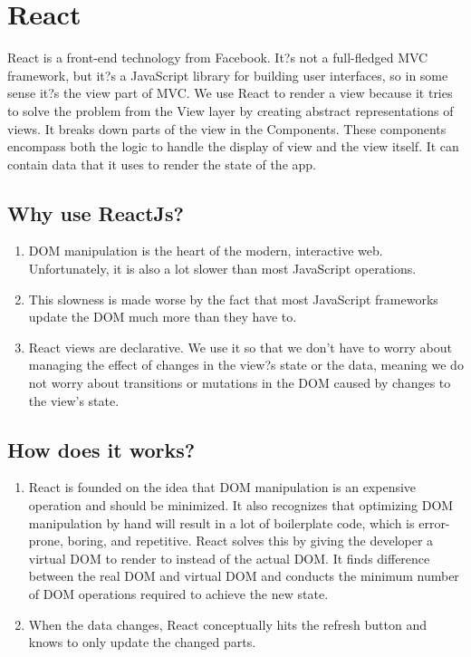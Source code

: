 \documentclass[12pt,a4paper]{report}
\begin{document}
\section{React}
React \cite{wiki:reactjs} is a front-end technology from Facebook. It?s not a full-fledged MVC framework, but it?s a JavaScript library for building user interfaces, so in some sense it?s the view part of MVC. We use React to render a view because it tries to solve the problem from the View layer by creating abstract representations of views. It breaks down parts of the view in the Components. These components encompass both the logic to handle the display of view and the view itself. It can contain data that it uses to render the state of the app. 
\subsection{Why use ReactJs?}\cite{parking_marketplace_srs}
\begin{enumerate}
	\renewcommand{\labelenumi}{{\textbf{\arabic{enumi}.}}}
	\item DOM manipulation is the heart of the modern, interactive web. Unfortunately, it is also a lot slower than most JavaScript operations.
	\item This slowness is made worse by the fact that most JavaScript frameworks update the DOM much more than they have to.
	\item React views are declarative. We use it so that we don't have to worry about managing the effect of changes in the view?s state or the data, meaning we do not worry about transitions or mutations in the DOM caused by changes to the view's state.  
\end{enumerate}
\subsection{How does it works?}\cite{parking_marketplace_srs}
\begin{enumerate}
	\renewcommand{\labelenumi}{{\textbf{\arabic{enumi}.}}}
	\item React is founded on the idea that DOM manipulation is an expensive operation and should be minimized. It also recognizes that optimizing DOM manipulation by hand will result in a lot of boilerplate code, which is error-prone, boring, and repetitive. React solves this by giving the developer a virtual DOM to render to instead of the actual DOM. It finds difference between the real DOM and virtual DOM and conducts the minimum number of DOM operations required to achieve the new state.  
	\item When the data changes, React conceptually hits the refresh button and knows to only update the changed parts.
  
\end{enumerate}
\end{document}
